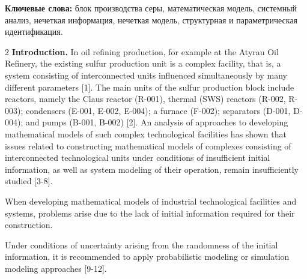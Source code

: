 {\bfseries Ключевые слова:} блок производства серы, математическая модель,
системный анализ, нечеткая информация, нечеткая модель, структурная и
параметрическая идентификация.

\begin{multicols}{2}
{\bfseries Introduction.} In oil refining production, for example at the
Atyrau Oil Refinery, the existing sulfur production unit is a complex
facility, that is, a system consisting of interconnected units
influenced simultaneously by many different parameters {[}1{]}. The main
units of the sulfur production block include reactors, namely the Claus
reactor (R-001), thermal (SWS) reactors (R-002, R-003); condensers
(E-001, E-002, E-004); a furnace (F-002); separators (D-001, D-004); and
pumps (B-001, B-002) {[}2{]}. An analysis of approaches to developing
mathematical models of such complex technological facilities has shown
that issues related to constructing mathematical models of complexes
consisting of interconnected technological units under conditions of
insufficient initial information, as well as system modeling of their
operation, remain insufficiently studied {[}3-8{]}.

When developing mathematical models of industrial technological
facilities and systems, problems arise due to the lack of initial
information required for their construction.

Under conditions of uncertainty arising from the randomness of the
initial information, it is recommended to apply probabilistic modeling
or simulation modeling approaches {[}9-12{]}.


\end{multicols}
